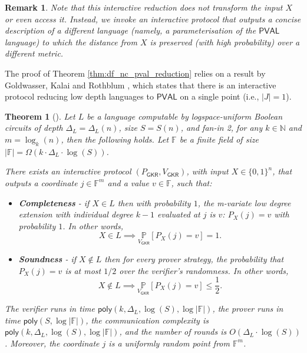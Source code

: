 \documentclass[11pt]{article}
\newtheorem{theorem}{Theorem}[section]
\newtheorem{remark}{Remark}
\newcommand{\poly}{\mathsf{poly}}
\newcommand{\PVAL}{\mathsf{PVAL}}
\newcommand{\GKR}{\mathsf{GKR}}
\newcommand{\F}{\mathbb{F}}
\newcommand{\N}{\mathbb{N}}
\begin{document}
\begin{remark}
Note that this interactive reduction does \emph{not} transform the input $X$ or even \textit{access} it. Instead, we invoke an interactive protocol that outputs a concise description of a different language (namely, a parameterisation of the $\PVAL$ language) to which the distance from $X$ is preserved (with high probability) over a different metric.
\end{remark}

The proof of Theorem \ref{thm:df_nc_pval_reduction}  relies on a result by Goldwasser, Kalai and Rothblum \cite{GKR15}, which states that there is an interactive protocol reducing low depth languages to $\PVAL$ on a single point (i.e., $\vert J\vert =1$).

\begin{theorem}[\cite{GKR15}]
\label{thm:gkr_red}
Let $L$ be a language computable by logspace-uniform  Boolean circuits of depth $\Delta_{L}=\Delta_{L}(n)$, size $S=S(n)$, and fan-in 2, for any $k\in \N$ and $m=\log_{k}(n)$, then the following holds. Let $\F$ be a finite field of size $|\F|= \Omega(k\cdot \Delta_{L}\cdot\log (S))$. 

There exists an interactive protocol $(P_{\GKR}, V_{\GKR})$, with input $X \in \{0,1\}^n$, that outputs a coordinate $j\in \mathbb{F}^{m}$ and a value $v\in \mathbb{F}$, such that:
\begin{itemize}
    \item \textbf{Completeness} - if $X\in L$ then with probability $1$, the m-variate low degree extension with individual degree $k-1$ evaluated at $j$ is $v$: $P_X(j)=v$ with probability $1$. In other words,
    \begin{equation*}
        X\in L \implies \underset{{V_{\GKR}}}{\mathbb{P}}[P_X(j)=v]=1.
    \end{equation*}
    
    \item \textbf{Soundness} - if $X\not\in L$ then  for every prover strategy, the probability that $P_X(j)=v$ is at most $1/2$ over the verifier's randomness. In other words,
    \begin{equation*}
        X\not\in L\implies \underset{{V_{\GKR}}}{\mathbb{P}}[P_X(j)=v]\leq \frac{1}{2}.
    \end{equation*}
\end{itemize}

The verifier runs in time $\poly(k,\Delta_{L},\log (S),\log |\F|)$, the prover runs in time $\poly(S,\log|\F|)$, the communication complexity is $\poly(k,\Delta_{L}, \log (S),\log |\F|)$, and the number of rounds is $O(\Delta_{L} \cdot \log(S))$. Moreover, the coordinate $j$ is a uniformly random point from $\F^m$.
\end{theorem}
\end{document}
